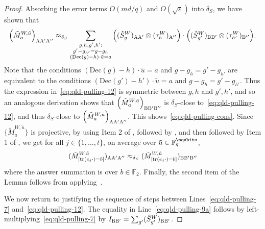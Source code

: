 \documentclass[11pt]{article}
\theoremstyle{definition}
\newcommand{\F}{\ensuremath{\mathbb{F}}}
\newcommand{\eps}{\varepsilon}
\DeclareMathOperator{\tr}{tr}
\newcommand{\labelstyle}[1]{\ensuremath{\textsc{#1}}\xspace}
\newcommand{\alice}{\labelstyle{A}}
\newcommand{\bob}{\labelstyle{B}}
\newcommand{\coded}{\mathrm{Dec}}
\begin{document}
\begin{proof}
		Absorbing the error terms $O(md/q)$ and $O(\sqrt{\eps})$ into $\delta_S$, we have shown that 
		\[
		\Big ( \tilde{M}^{W,\tilde{u}}_a \Big)_{\alice \alice' \alice''} \approx_{\delta_S} \sum_{\substack{g,h,g',h': \\ g' - g_{h'} = g -g_h \\ (\coded(g)-h)\cdot \tilde{u} = a}} \Big((\hat{S}^W_g)_{\alice \alice'} \otimes (\tau_h^W)_{\alice''} \Big) \cdot \Big( (\hat{S}^W_{g'})_{\bob \bob'} \otimes (\tau_{h'}^W)_{\bob''} \Big).
		\]
		Note that the conditions $(\coded(g)-h)\cdot \tilde{u} = a$ and $g - g_h = g' - g_{h'}$ are equivalent to the conditions $(\coded(g') - h') \cdot \tilde{u} = a$ and $g - g_h = g' - g_{h'}$. Thus the expression in~\eqref{eq:qld-pulling-12} is symmetric between $g,h$ and $g',h'$, and so an analogous derivation shows that $\Big ( \tilde{M}^{W,\tilde{u}}_a \Big)_{\bob \bob' \bob''}$ is $\delta_S$-close to~\eqref{eq:qld-pulling-12}, and thus $\delta_S$-close to $\Big ( \tilde{M}^{W,\tilde{u}}_a \Big)_{\alice \alice' \alice''}$. This shows~\eqref{eq:qld-pulling-cons}. Since $\{ \tilde{M}^{W,\tilde{u}}_a \}$ is projective, by using Item 2 of , followed by , and then followed by Item 1 of , we get for all $j \in \{1,\ldots,t\}$, on average over $\tilde{u} \in \F_q^\nqubits$,
\[
	(\tilde{M}^{W,\tilde{u}}_{[\tr(e_j \cdot) = b]})_{\alice \alice' \alice''} \approx_{\delta_S} ( \tilde{M}^{W,\tilde{u}}_{[\tr(e_j \cdot) = b]})_{\bob \bob' \bob''}
\]
where the answer summation is over $b \in \F_2$. Finally, the second item of the Lemma follows from applying~.

		We now return to justifying the sequence of steps between Lines~\eqref{eq:qld-pulling-7} and~\eqref{eq:qld-pulling-12}. The equality in Line~\eqref{eq:qld-pulling-9a} follows by left-multiplying~\eqref{eq:qld-pulling-7} by $I_{\bob \bob'} = \sum_{g'} (\hat{S}^W_{g'})_{\bob \bob'}$. 
		

\end{proof}
\end{document}
